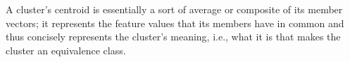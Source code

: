 {%
A cluster's centroid is essentially a sort of average or composite of its member vectors; it represents the feature values that its members have in common and thus concisely represents the cluster's meaning, i.e., what it is that makes the cluster an equivalence class. %

}

